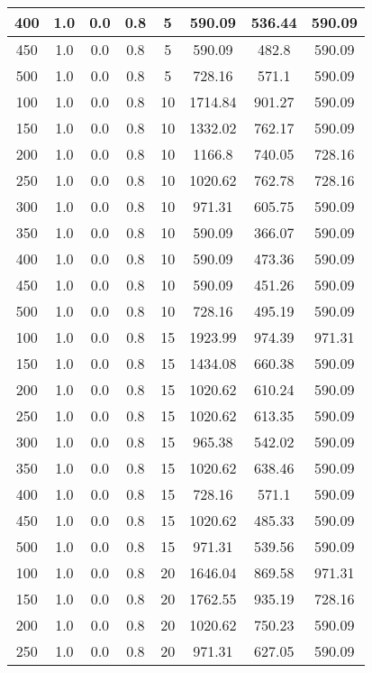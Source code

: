 \documentclass[a4paper, 12pt]{extreport}
\begin{document}
\begin{itemize}
\begin{longtable}{|c|c|c|c|c|c|c|c|}
			400 & 1.0 & 0.0 & 0.8 & 5 & 590.09 & 536.44 & 590.09 \\\hline
			450 & 1.0 & 0.0 & 0.8 & 5 & 590.09 & 482.8 & 590.09 \\\hline
			500 & 1.0 & 0.0 & 0.8 & 5 & 728.16 & 571.1 & 590.09 \\\hline
			100 & 1.0 & 0.0 & 0.8 & 10 & 1714.84 & 901.27 & 590.09 \\\hline
			150 & 1.0 & 0.0 & 0.8 & 10 & 1332.02 & 762.17 & 590.09 \\\hline
			200 & 1.0 & 0.0 & 0.8 & 10 & 1166.8 & 740.05 & 728.16 \\\hline
			250 & 1.0 & 0.0 & 0.8 & 10 & 1020.62 & 762.78 & 728.16 \\\hline
			300 & 1.0 & 0.0 & 0.8 & 10 & 971.31 & 605.75 & 590.09 \\\hline
			350 & 1.0 & 0.0 & 0.8 & 10 & 590.09 & 366.07 & 590.09 \\\hline
			400 & 1.0 & 0.0 & 0.8 & 10 & 590.09 & 473.36 & 590.09 \\\hline
			450 & 1.0 & 0.0 & 0.8 & 10 & 590.09 & 451.26 & 590.09 \\\hline
			500 & 1.0 & 0.0 & 0.8 & 10 & 728.16 & 495.19 & 590.09 \\\hline
			100 & 1.0 & 0.0 & 0.8 & 15 & 1923.99 & 974.39 & 971.31 \\\hline
			150 & 1.0 & 0.0 & 0.8 & 15 & 1434.08 & 660.38 & 590.09 \\\hline
			200 & 1.0 & 0.0 & 0.8 & 15 & 1020.62 & 610.24 & 590.09 \\\hline
			250 & 1.0 & 0.0 & 0.8 & 15 & 1020.62 & 613.35 & 590.09 \\\hline
			300 & 1.0 & 0.0 & 0.8 & 15 & 965.38 & 542.02 & 590.09 \\\hline
			350 & 1.0 & 0.0 & 0.8 & 15 & 1020.62 & 638.46 & 590.09 \\\hline
			400 & 1.0 & 0.0 & 0.8 & 15 & 728.16 & 571.1 & 590.09 \\\hline
			450 & 1.0 & 0.0 & 0.8 & 15 & 1020.62 & 485.33 & 590.09 \\\hline
			500 & 1.0 & 0.0 & 0.8 & 15 & 971.31 & 539.56 & 590.09 \\\hline
			100 & 1.0 & 0.0 & 0.8 & 20 & 1646.04 & 869.58 & 971.31 \\\hline
			150 & 1.0 & 0.0 & 0.8 & 20 & 1762.55 & 935.19 & 728.16 \\\hline
			200 & 1.0 & 0.0 & 0.8 & 20 & 1020.62 & 750.23 & 590.09 \\\hline
			250 & 1.0 & 0.0 & 0.8 & 20 & 971.31 & 627.05 & 590.09 \\\hline

\end{longtable}
\end{itemize}
\end{document}
